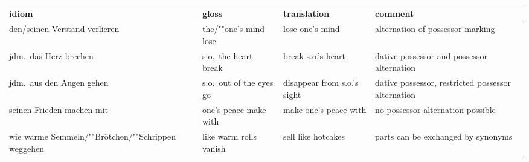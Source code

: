 \documentclass[output=paper,biblatex,babelshorthands,newtxmath,draftmode,colorlinks,citecolor=brown]{langscibook}
\begin{document}
\begin{sideways}
\begin{tabular}{@{}L{4cm}lL{4.0cm}L{4.0cm}}
idiom & gloss & translation & comment\\\hline
%
 {den/seinen Verstand verlieren}
 & {the/""one's mind lose}
 & {lose one's mind}
 & {alternation of possessor marking}
 \\
 {jdm.\ das Herz brechen} & s.o.\ the heart break & break s.o.'s heart
 & {dative possessor and possessor alternation}\\
 {jdm.\ aus den Augen gehen} & s.o.\ out of the eyes go
 & {disappear from s.o.'s sight} &
 {dative possessor, restricted possessor alternation}\\
 {seinen Frieden machen mit}
 & {one's peace make with}
 & {make one's peace with}
 & {no possessor alternation possible}\\
 {wie warme Semmeln/""Brötchen/""Schrippen weggehen}
 & {like warm rolls vanish} & sell like hotcakes & 
 {parts can be exchanged by synonyms}\\
\end{tabular}
\end{sideways}


{\sloppy
\printbibliography[heading=subbibliography,notkeyword=this] }
\end{document}

